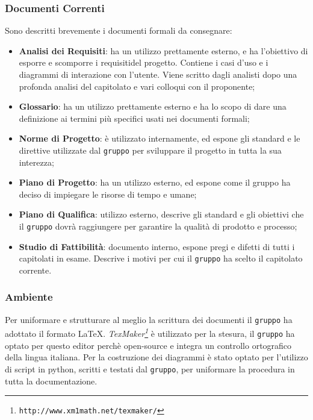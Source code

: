 \subsubsection{Documenti Correnti}
Sono descritti brevemente i documenti formali da consegnare:
\begin{itemize}
	\item \textbf{Analisi dei Requisiti}: ha un utilizzo prettamente esterno, e ha l'obiettivo di esporre e scomporre i requisiti\glossario del progetto. Contiene i casi d'uso e i diagrammi di interazione con l'utente. Viene scritto dagli analisti dopo una profonda analisi del capitolato e vari colloqui con il proponente; 
	\item \textbf{Glossario}: ha un utilizzo prettamente esterno e ha lo scopo di dare una definizione ai termini più specifici usati nei documenti formali;
	\item \textbf{Norme di Progetto}: è utilizzato internamente, ed espone gli standard e le direttive utilizzate dal \texttt{gruppo} per sviluppare il progetto in tutta la sua interezza;
	\item \textbf{Piano di Progetto}: ha un utilizzo esterno, ed espone come il gruppo ha deciso di impiegare le risorse di tempo e umane;
	\item \textbf{Piano di Qualifica}: utilizzo esterno, descrive gli standard e gli obiettivi che il \texttt{gruppo} dovrà raggiungere per garantire la qualità di prodotto e processo;
	\item \textbf{Studio di Fattibilità}: documento interno, espone pregi e difetti di tutti i capitolati in esame. Descrive i motivi per cui il \texttt{gruppo} ha scelto il capitolato corrente.
\end{itemize}

\subsubsection{Ambiente}
Per uniformare e strutturare al meglio la scrittura dei documenti il \texttt{gruppo} ha adottato il formato \LaTeX. 
\textit{TexMaker\footnote{\texttt{http://www.xm1math.net/texmaker/}}} è utilizzato per la stesura, il \texttt{gruppo} ha optato per questo editor perchè open-source e integra un controllo ortografico della lingua italiana. 
Per la costruzione dei diagrammi è stato optato per l'utilizzo di script in python, scritti e testati dal \texttt{gruppo}, per uniformare la procedura in tutta la documentazione.




